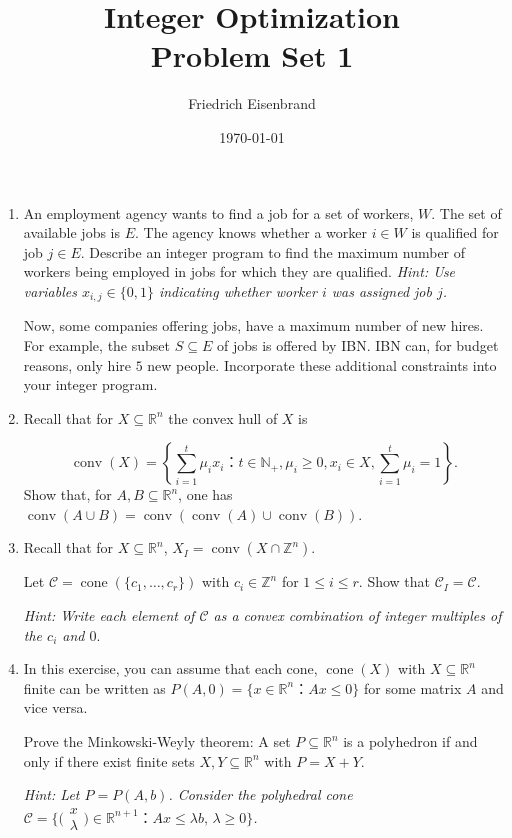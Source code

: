 \documentclass[11pt,a4paper]{article}
\title{Integer Optimization  \\ Problem Set 1 }
\author{ Friedrich Eisenbrand}
\date{\today}
\newcommand{\smat}[1]{ \big(\begin{smallmatrix} #1 \end{smallmatrix}\big)}
\DeclareMathOperator{\conv}{conv}
\DeclareMathOperator{\cone}{cone}
\begin{document}
\maketitle 




\begin{enumerate} 
\item An employment agency wants to find a job for a set of workers, $W$. The set of available jobs is $E$. The agency knows whether a worker $i ∈ W$ is qualified for job $j ∈ E$. Describe an integer program to find the maximum number of workers being employed in jobs for which they are qualified. \emph{Hint: Use variables $x_{i,j} ∈ \{0,1\}$ indicating whether worker $i$ was assigned job $j$.}

Now, some companies offering jobs, have a maximum number of new hires. For example, the subset $S⊆ E$ of jobs is offered by IBN. IBN can, for budget reasons, only hire $5$ new people. Incorporate these additional  constraints into your integer program. 
\item Recall that for $X ⊆ ℝ^n$ the convex hull of $X$ is

  \begin{displaymath}
      \conv(X) = \left\{ ∑_{i=1}^t μ_i x_i ： t ∈ ℕ_+, μ_i ≥0, x_i ∈ X, ∑_{i=1}^t μ_i =1 \right\}.
  \end{displaymath}
Show that, for $A,B ⊆ ℝ^n$, one has $\conv(A ∪B) = \conv\left( \conv(A) ∪ \conv(B) \right)$.  

\item
  Recall that for $X ⊆ ℝ^n$, $X_I = \conv( X ∩ ℤ^n)$. 
  
  Let $\mathscr{C} = \cone(\{c_1,\dots,c_r\})$ with $c_i ∈ℤ^n$ for $1≤i≤r$. Show that $\mathscr{C}_I = \mathscr{C}$.

  \emph{Hint: Write each element of $\mathscr{C}$ as a convex combination of integer multiples of the $c_i$ and $0$}.

\item In this exercise, you can assume that each cone, $\cone (X)$ with $X ⊆ℝ^n$ finite can be written as $P(A,0) = \{ x ∈ℝ^n ： Ax≤0\}$ for some matrix $A$ and vice versa.

  Prove the Minkowski-Weyly theorem: A set $P ⊆ ℝ^n$ is a polyhedron if and only if there exist finite sets $X,Y ⊆ ℝ^n$ with $P = X+Y$.

  \emph{Hint: Let $P = P(A,b)$. Consider the polyhedral cone $\mathscr{C} = \{ \smat{x\\λ} ∈ℝ^{n+1}  ：Ax ≤ λb, \, λ≥0 \}$. }


\end{enumerate}
\end{document}
